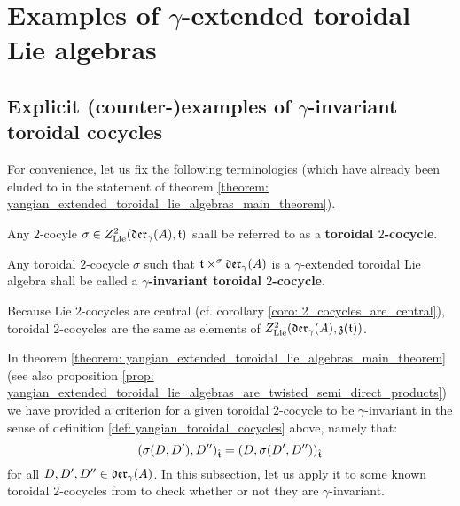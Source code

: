 \section{Examples of \texorpdfstring{$\gamma$}{}-extended toroidal Lie algebras}
    \subsection{Explicit (counter-)examples of $\gamma$-invariant toroidal cocycles}
        For convenience, let us fix the following terminologies (which have already been eluded to in the statement of theorem \ref{theorem: yangian_extended_toroidal_lie_algebras_main_theorem}).
        \begin{definition} \label{def: yangian_toroidal_cocycles}
            Any $2$-cocyle $\sigma \in Z^2_{\mathrm{Lie}}(\mathfrak{der}_{\gamma}(A), \mathfrak{t})$ shall be referred to as a \textbf{toroidal $2$-cocycle}.
            
            Any toroidal $2$-cocycle $\sigma$ such that $\mathfrak{t} \rtimes^{\sigma} \mathfrak{der}_{\gamma}(A)$ is a $\gamma$-extended toroidal Lie algebra shall be called a \textbf{$\gamma$-invariant toroidal $2$-cocycle}.
        \end{definition}
        \begin{remark}
            Because Lie $2$-cocycles are central (cf. corollary \ref{coro: 2_cocycles_are_central}), toroidal $2$-cocycles are the same as elements of $Z^2_{\mathrm{Lie}}( \mathfrak{der}_{\gamma}(A), \mathfrak{z}(\mathfrak{t}) )$.
        \end{remark}
        
        In theorem \ref{theorem: yangian_extended_toroidal_lie_algebras_main_theorem} (see also proposition \ref{prop: yangian_extended_toroidal_lie_algebras_are_twisted_semi_direct_products}) we have provided a criterion for a given toroidal $2$-cocycle to be $\gamma$-invariant in the sense of definition \ref{def: yangian_toroidal_cocycles} above, namely that:
            $$( \sigma(D, D'), D'' )_{\hat{\mathfrak{t}}} = ( D, \sigma(D', D'') )_{\hat{\mathfrak{t}}}$$
        for all $D, D', D'' \in \mathfrak{der}_{\gamma}(A)$. In this subsection, let us apply it to some known toroidal $2$-cocycles from \cite{billig_energy_momentum_tensor} to check whether or not they are $\gamma$-invariant.

